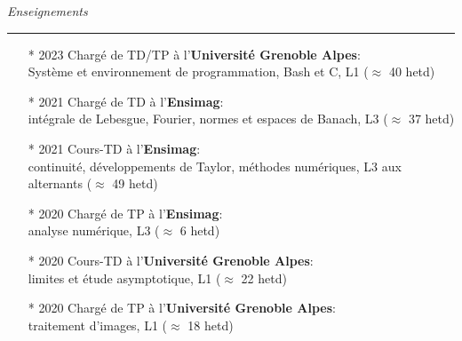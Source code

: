 {	%
	\noindent
	\textit{\Large \color{MyGray} \hspace{5mm} Enseignements}
	\vspace{2mm}
	{\color{DefaultGray}\hrule height .1pt}
	\vspace{4mm}
	
	\begin{itemize}
		\setlength\itemsep{3mm}
		\item[*] 2023 Chargé de TD/TP à l'\textbf{Université Grenoble Alpes}:\\
		Système et environnement de programmation, Bash et C, L1 ($\approx$ 40 hetd)
		\item[*] 2021 Chargé de TD à l'\textbf{Ensimag}:\\
		intégrale de Lebesgue, Fourier, normes et espaces de Banach, L3 ($\approx$ 37 hetd)
		\item[*] 2021 Cours-TD à l'\textbf{Ensimag}:\\
		continuité, développements de Taylor, méthodes numériques, L3 aux alternants ($\approx$ 49 hetd)
		\item[*] 2020 Chargé de TP à l'\textbf{Ensimag}:\\ analyse numérique, L3 ($\approx$ 6 hetd)
		\item[*] 2020 Cours-TD à l'\textbf{Université Grenoble Alpes}:\\
		limites et étude asymptotique, L1 ($\approx$ 22 hetd)
		\item[*] 2020 Chargé de TP à l'\textbf{Université Grenoble Alpes}:\\
		traitement d'images, L1 ($\approx$ 18 hetd)
	\end{itemize}
	
	\vspace{5mm}
	
}
